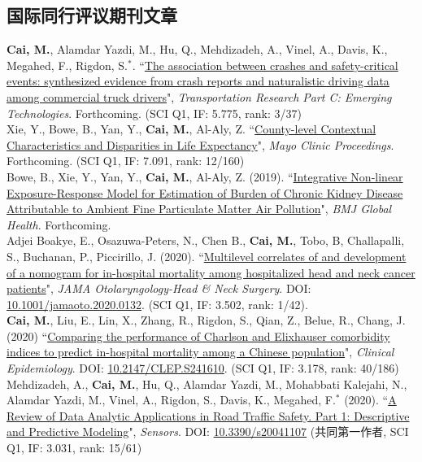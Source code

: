 \documentclass[11pt, a4paper]{article}
\newcommand{\years}[1]{\marginnote{\scriptsize #1}}
\begin{document}
\subsection*{国际同行评议期刊文章}
\noindent
\years{2020}\textbf{Cai, M.}, Alamdar Yazdi, M., Hu, Q., Mehdizadeh, A., Vinel, A., Davis, K., Megahed, F., Rigdon, S.$^\ast$. ``\ul{The association between crashes and safety-critical events: synthesized evidence from crash reports and naturalistic driving data among commercial truck drivers}", \emph{Transportation Research Part C: Emerging Technologies}. Forthcoming. (SCI Q1, IF: 5.775, rank: 3/37)\\[6pt]
\years{2020}Xie, Y., Bowe, B., Yan, Y., \textbf{Cai, M.}, Al-Aly, Z. ``\ul{County-level Contextual Characteristics and Disparities in Life Expectancy}", \emph{Mayo Clinic Proceedings}. Forthcoming. (SCI Q1, IF: 7.091, rank: 12/160)\\
\years{2020}Bowe, B., Xie, Y., Yan, Y., \textbf{Cai, M.}, Al-Aly, Z. (2019). ``\ul{Integrative Non-linear Exposure-Response Model for Estimation of Burden of Chronic Kidney Disease Attributable to Ambient Fine Particulate Matter Air Pollution}", \emph{BMJ Global Health}. Forthcoming. \\[6pt]
\years{2020}Adjei Boakye, E., Osazuwa-Peters, N., Chen B., \textbf{Cai, M.}, Tobo, B, Challapalli, S., Buchanan, P., Piccirillo, J. (2020). ``\ul{Multilevel correlates of and development of a nomogram for in-hospital mortality among hospitalized head and neck cancer patients}", \emph{JAMA Otolaryngology-Head \& Neck Surgery}. DOI: \href{https://doi.org/10.1001/jamaoto.2020.0132}{10.1001/jamaoto.2020.0132}. (SCI Q1, IF: 3.502, rank: 1/42).\\[6pt]
\years{2020}\textbf{Cai, M.}, Liu, E., Lin, X., Zhang, R., Rigdon, S., Qian, Z., Belue, R., Chang, J. (2020) ``\ul{Comparing the performance of Charlson and Elixhauser comorbidity indices to predict in-hospital mortality among a Chinese population}", \emph{Clinical Epidemiology}. DOI: \href{https://doi.org/10.2147/CLEP.S241610}{10.2147/CLEP.S241610}. (SCI Q1, IF: 3.178, rank: 40/186)\\[6pt]
\years{2020}Mehdizadeh, A., \textbf{Cai, M.}, Hu, Q., Alamdar Yazdi, M., Mohabbati Kalejahi, N., Alamdar Yazdi, M., Vinel, A., Rigdon, S., Davis, K., Megahed, F.$^\ast$ (2020). ``\ul{A Review of Data Analytic Applications in Road Traffic Safety. Part 1: Descriptive and Predictive Modeling}", \emph{Sensors}. DOI: \href{https://doi.org/10.3390/s20041107}{10.3390/s20041107} (共同第一作者, SCI Q1, IF: 3.031, rank: 15/61)\\[6pt]
\end{document}
